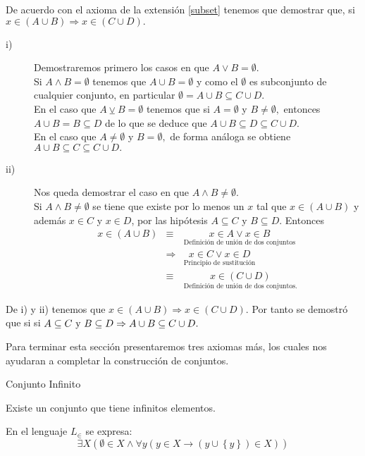 \begin{prueba}{} De acuerdo con el axioma de la extensión \ref{subset}
tenemos que demostrar que, si $x\in\left(A\cup B\right)\Rightarrow x\in\left(C\cup D\right).$
\begin{description}
\item [{i)}] Demostraremos primero los casos en que $A\vee B=\emptyset.$\\[5pt]
Si $A\wedge B=\emptyset$ tenemos que $A\cup B=\emptyset$ y como
el $\emptyset$ es subconjunto de cualquier conjunto, en particular
$\emptyset=A\cup B\subseteq C\cup D.$ \\[5pt] En el caso que $A\veebar B=\emptyset$
tenemos que si $A=\emptyset$ y $B\neq\emptyset,$ entonces $A\cup B=B\subseteq D$
de lo que se deduce que $A\cup B\subseteq D\subseteq C\cup D.$\\[5pt]En
el caso que $A\neq\emptyset$ y $B=\emptyset,$ de forma análoga se
obtiene $A\cup B\subseteq C\subseteq C\cup D.$
\item [{ii)}] Nos queda demostrar el caso en que $A\wedge B\neq\emptyset.$
\\[5pt] Si $A\wedge B\neq\emptyset$ se tiene que existe por lo menos
un $x$ tal que $x\in\left(A\cup B\right)$ y además $x\in C$ y $x\in D$,
por las hipótesis $A\subseteq C$ y $B\subseteq D.$ Entonces
\begin{eqnarray*}
x\in\left(A\cup B\right) & \equiv & \underset{\mbox{Definición de unión de dos conjuntos}}{x\in A\vee x\in B}\\
 & \Rightarrow & \underset{\mbox{Principio de sustitución}}{x\in C\vee x\in D}\\
 & \equiv & \underset{\mbox{Definición de unión de dos conjuntos.}}{x\in\left(C\cup D\right)}
\end{eqnarray*}
\end{description}
De i) y ii) tenemos que $x\in\left(A\cup B\right)\Rightarrow x\in\left(C\cup D\right).$
Por tanto se demostró que si si $A\subseteq C\mbox{ y \ensuremath{B\subseteq D\Rightarrow A\cup B\subseteq C\cup D}}.$

\end{prueba}

Para terminar esta sección presentaremos tres axiomas más, los cuales
nos ayudaran a completar la construcción de conjuntos. 

\begin{axioma}{Conjunto Infinito}{}\label{ainf}

Existe un conjunto que tiene infinitos elementos.

En el lenguaje $L_{\in}$ se expresa:
\[
\exists X\left(\emptyset\in X\wedge\forall y\left(y\in X\rightarrow\left(y\cup\left\{ y\right\} \right)\in X\right)\right)
\]

\end{axioma}

